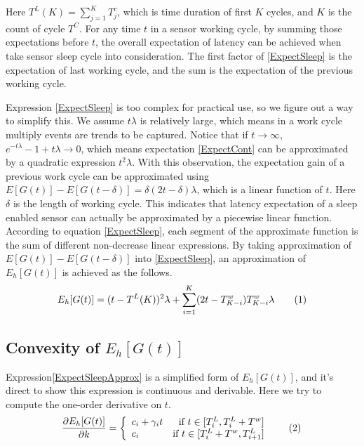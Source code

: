 \documentclass[conference]{IEEEtran}
\newcommand\numberthis{\addtocounter{equation}{1}\tag{\theequation}}
\begin{document}
Here $T^{L}(K) = \sum_{j=1}^{K} T^{c}_{j}$, which is time duration of first $K$ cycles, and $K$ is the count of cycle $T^{C}$. 
For any time $t$ in a sensor working cycle, by summing those expectations before $t$, the overall expectation of latency can be achieved when take sensor sleep cycle into consideration. The first factor of \eqref{ExpectSleep} is the expectation of last working cycle, and the sum is the expectation of the previous working cycle.


Expression \eqref{ExpectSleep} is too complex for practical use, so we figure out a way to simplify this. 
We assume $t\lambda$ is relatively large, which means in a work cycle multiply events are trends to be captured.
Notice that if $t\rightarrow \infty$, $e^{-t\lambda}-1+t \lambda \rightarrow 0$, which means expectation \eqref{ExpectCont} can be approximated by a quadratic expression $t^2\lambda$.
With this observation, the expectation gain of a previous work cycle can be approximated using $E[G(t)]-E[G(t-\delta)] = \delta (2 t - \delta)\lambda$, which is a linear function of $t$. Here $\delta$ is the length of working cycle.
This indicates that latency expectation of a sleep enabled sensor can actually be approximated by a piecewise linear function.
According to equation \eqref{ExpectSleep}, each segment of the approximate function is the sum of different non-decrease linear expressions.
By taking approximation of $E[G(t)]-E[G(t-\delta)]$ into \eqref{ExpectSleep}, an approximation of $E_h[G(t)]$ is achieved as the follows.
\begin{align*}
E_h[G(t)] = (t-T^{L}(K))^2\lambda + \sum_{i=1}^{K} (2 t - T^{w}_{K-i})T^{w}_{K-i}\lambda
\numberthis 
\label{ExpectSleepApprox}
\end{align*}

\subsection{Convexity of $E_h[G(t)]$}
Expression\eqref{ExpectSleepApprox} is a simplified form of $E_h[G(t)]$, and it's direct to show this expression is continuous and derivable. Here we try to compute the one-order derivative on $t$.
\[\frac{\partial E_h[G(t)]}{\partial k} = \left\{
	\begin{array}{lr}
	c_i+\gamma_i t & \text{if }t \in [T^{L}_{i}, T^{L}_{i}+T^{w}]\\
	c_i & \text{if }t \in [T^{L}_{i}+T^{w}, T^{L}_{i+1}]
	\end{array}	\numberthis \label{ExpectSleepAnother}
	\right.
\]
\end{document}
